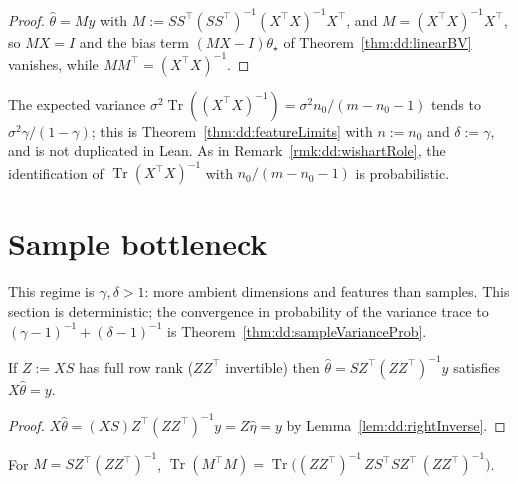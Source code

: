 \begin{proof}
  \leanok
$\hat\theta=My$ with $M:=S S^\top(SS^\top)^{-1}(X^\top X)^{-1}X^\top$, and $M=(X^\top X)^{-1}X^\top$, so $MX=I$ and the bias term
$(MX-I)\theta_\star$ of Theorem~\ref{thm:dd:linearBV} vanishes, while $MM^\top=(X^\top X)^{-1}$.
\end{proof}

\begin{remark}[Asymptotics]\label{rmk:dd:ambientAsymptotics}
The expected variance $\sigma^2\operatorname{Tr}((X^\top X)^{-1})=\sigma^2n_0/(m-n_0-1)$ tends to $\sigma^2\gamma/(1-\gamma)$; this is
Theorem~\ref{thm:dd:featureLimits} with $n:=n_0$ and $\delta:=\gamma$, and is not duplicated in Lean. As in
Remark~\ref{rmk:dd:wishartRole}, the identification of $\operatorname{Tr}(X^\top X)^{-1}$ with $n_0/(m-n_0-1)$ is probabilistic.
\end{remark}


\section{Sample bottleneck}\label{sec:dd:sample}

This regime is $\gamma,\delta>1$: more ambient dimensions and features than samples. This section is deterministic; the convergence in probability of the variance trace to $(\gamma-1)^{-1}+(\delta-1)^{-1}$ is Theorem~\ref{thm:dd:sampleVarianceProb}.

\begin{theorem}\label{thm:dd:sampleInterpolates}
  \leanok
If $Z:=XS$ has full row rank ($ZZ^\top$ invertible) then $\hat\theta=SZ^\top(ZZ^\top)^{-1}y$ satisfies $X\hat\theta=y$.
\end{theorem}

\begin{proof}
  \leanok
$X\hat\theta=(XS)Z^\top(ZZ^\top)^{-1}y=Z\hat\eta=y$ by Lemma~\ref{lem:dd:rightInverse}.
\end{proof}

\begin{lemma}\label{lem:dd:sampleTrace}
  \leanok
For $M=SZ^\top(ZZ^\top)^{-1}$,
$\operatorname{Tr}(M^\top M)=\operatorname{Tr}\bigl((ZZ^\top)^{-1}\,Z S^\top S Z^\top\,(ZZ^\top)^{-1}\bigr)$.
\end{lemma}

